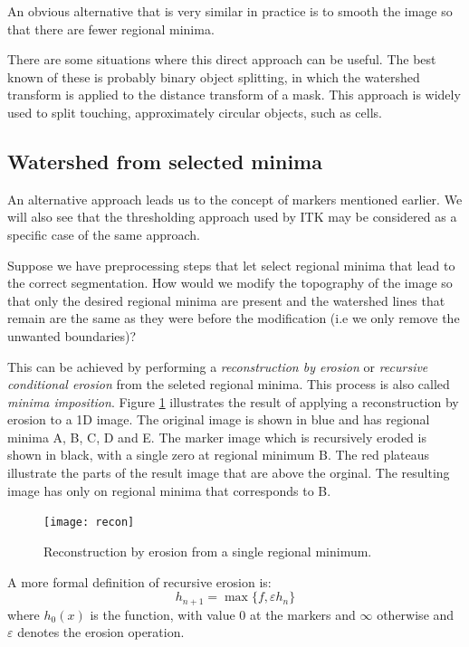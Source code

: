 \documentclass{InsightArticle}
\begin{document}
An obvious alternative that is very similar in practice is to 
smooth the image so that there are fewer regional minima.

There are some situations where this direct approach can be
useful. The best known of these is probably binary object splitting,
in which the watershed transform is applied to the distance transform
of a mask. This approach is widely used to split touching,
approximately circular objects, such as cells.

\subsection{Watershed from selected minima}
\label{sect:ws-selected-minima}
An alternative approach leads us to the concept of markers mentioned
earlier. We will also see that the thresholding approach used by ITK
may be considered as a specific case of the same approach.

Suppose we have preprocessing steps that let select regional minima
that lead to the correct segmentation. How would we modify the
topography of the image so that only the desired regional minima are
present and the watershed lines that remain are the same as they were
before the modification (i.e we only remove the unwanted boundaries)?

This can be achieved by performing a {\em reconstruction by erosion}
or {\em recursive conditional erosion} from the seleted regional
minima. This process is also called {\em minima imposition}. Figure
\ref{fig:recon} illustrates the result of applying a
reconstruction by erosion to a 1D image. The original image is shown
in blue and has regional minima A, B, C, D and E. The marker image
which is recursively eroded is shown in black, with a single zero at
regional minimum B. The red plateaus illustrate the parts of the
result image that are above the orginal. The resulting image has only
on regional minima that corresponds to B.
\begin{figure}[htbp]
\begin{center}
\texttt{[image: recon]}
\caption{Reconstruction by erosion from a single regional minimum.}
\label{fig:recon}
\end{center}
\end{figure}

A more formal definition of recursive erosion is:
\begin{equation}
\label{eq:recon_erosion}
h_{n+1}=\max\{f, \varepsilon h_n\}
\end{equation}
where $h_0(x)$ is the function, with value 0 at the markers and
$\infty$ otherwise and $\varepsilon$ denotes the erosion
operation.
\end{document}
